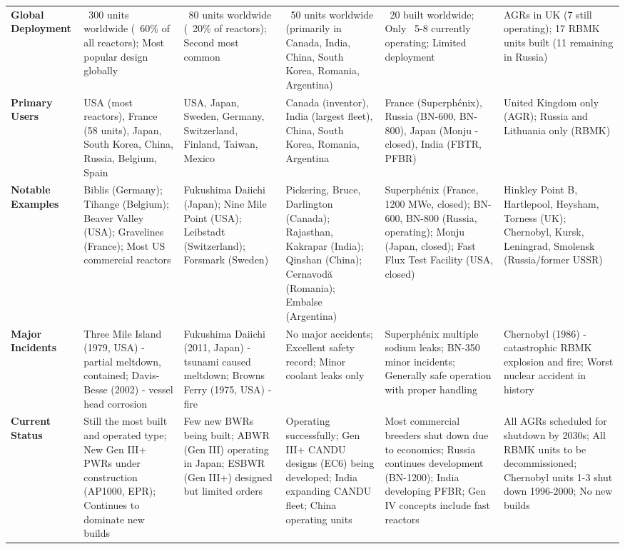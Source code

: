 \documentclass{article}
\begin{document}
\begin{longtable}{>{\raggedright\arraybackslash}p{3.5cm}*{5}{>{\raggedright\arraybackslash}p{3.2cm}}}
\multicolumn{6}{l}{\textbf{\Large Deployment \& Operational History}} \\
\midrule

\textbf{Global Deployment} & ~300 units worldwide (~60\% of all reactors); Most popular design globally & ~80 units worldwide (~20\% of reactors); Second most common & ~50 units worldwide (primarily in Canada, India, China, South Korea, Romania, Argentina) & ~20 built worldwide; Only ~5-8 currently operating; Limited deployment & 14 AGRs in UK (7 still operating); 17 RBMK units built (11 remaining in Russia) \\
\midrule

\textbf{Primary Users} & USA (most reactors), France (58 units), Japan, South Korea, China, Russia, Belgium, Spain & USA, Japan, Sweden, Germany, Switzerland, Finland, Taiwan, Mexico & Canada (inventor), India (largest fleet), China, South Korea, Romania, Argentina & France (Superphénix), Russia (BN-600, BN-800), Japan (Monju - closed), India (FBTR, PFBR) & United Kingdom only (AGR); Russia and Lithuania only (RBMK) \\
\midrule

\textbf{Notable Examples} & Biblis (Germany); Tihange (Belgium); Beaver Valley (USA); Gravelines (France); Most US commercial reactors & Fukushima Daiichi (Japan); Nine Mile Point (USA); Leibstadt (Switzerland); Forsmark (Sweden) & Pickering, Bruce, Darlington (Canada); Rajasthan, Kakrapar (India); Qinshan (China); Cernavodă (Romania); Embalse (Argentina) & Superphénix (France, 1200 MWe, closed); BN-600, BN-800 (Russia, operating); Monju (Japan, closed); Fast Flux Test Facility (USA, closed) & Hinkley Point B, Hartlepool, Heysham, Torness (UK); Chernobyl, Kursk, Leningrad, Smolensk (Russia/former USSR) \\
\midrule

\textbf{Major Incidents} & Three Mile Island (1979, USA) - partial meltdown, contained; Davis-Besse (2002) - vessel head corrosion & Fukushima Daiichi (2011, Japan) - tsunami caused meltdown; Browns Ferry (1975, USA) - fire & No major accidents; Excellent safety record; Minor coolant leaks only & Superphénix multiple sodium leaks; BN-350 minor incidents; Generally safe operation with proper handling & Chernobyl (1986) - catastrophic RBMK explosion and fire; Worst nuclear accident in history \\
\midrule

\textbf{Current Status} & Still the most built and operated type; New Gen III+ PWRs under construction (AP1000, EPR); Continues to dominate new builds & Few new BWRs being built; ABWR (Gen III) operating in Japan; ESBWR (Gen III+) designed but limited orders & Operating successfully; Gen III+ CANDU designs (EC6) being developed; India expanding CANDU fleet; China operating units & Most commercial breeders shut down due to economics; Russia continues development (BN-1200); India developing PFBR; Gen IV concepts include fast reactors & All AGRs scheduled for shutdown by 2030s; All RBMK units to be decommissioned; Chernobyl units 1-3 shut down 1996-2000; No new builds \\
\midrule


\end{longtable}
\end{document}
